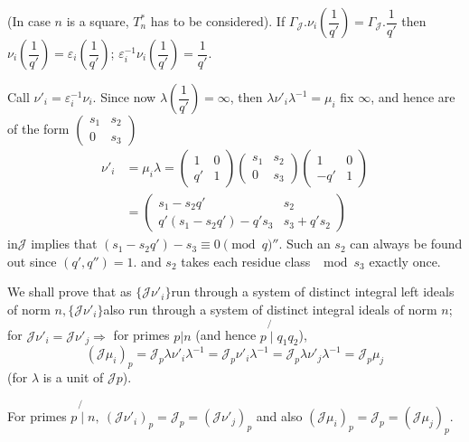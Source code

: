 (In case $n$ is a square, $T^*_n$ has to be considered). If
$\Gamma_\mathcal{J}. \nu_i \left(\dfrac{1}{q'}\right)=
\Gamma_\mathcal{J}. \dfrac{1}{q'}$ then $\nu_i \left(\dfrac{1}{q'}\right) =
\varepsilon_i \left(\dfrac{1}{q'}\right)$; $\varepsilon^{-1}_i \nu_i
\left(\dfrac{1}{q'}\right) = \dfrac{1}{q'}$. 

Call $\nu'_i = \varepsilon^{-1}_i \nu_i$. Since now $\lambda
\left(\dfrac{1}{q'}\right) = \infty$, then $\lambda \nu'_i \lambda^{-1}= \mu_i$
fix $\infty$, and hence are of the form $\begin{pmatrix} s_1 & s_2
  \\ 0 & s_3 \end{pmatrix}$ 
\begin{align*}
  \nu'_i & = \mu_i \lambda = \begin{pmatrix} 1 & 0 \\ q' &
    1 \end{pmatrix}\begin{pmatrix} s_1 & s_2 \\ 0 &
    s_3 \end{pmatrix}\begin{pmatrix} 1 & 0 \\ -q' & 1 \end{pmatrix}\\ 
  & = \begin{pmatrix} s_1-s_2q' & s_2 \\ q'(s_1-s_2q')-q's_3 &
    s_3+q's_2 \end{pmatrix} 
\end{align*}
in\pageoriginale $\mathcal{J}$ implies that $(s_1 - s_2q') - s_3 \equiv 0 \pmod
q''$. Such an $s_2$ can always be found out since $(q', q'')=1$. and
$s_2$ takes each residue class $\mod s_3$ exactly once. 

We shall prove that as $\bigg\{\mathcal{J}\nu'_i \bigg \}$run through a
system of distinct integral left ideals of norm
$n,\bigg\{\mathcal{J}\nu'_i \bigg \}$also run through a system of
distinct integral ideals of norm $n$; for
$\mathcal{J}\nu'_i=\mathcal{J}\nu'_j \Rightarrow$ for primes
$p|n$ (and hence $p \not {\mid} q_1 q_2$), 
$$
(\mathcal{J}\mu_i)_p = \mathcal{J}_p \lambda \nu'_i \lambda^{-1} =
\mathcal{J}_p \nu'_i \lambda^{-1} = \mathcal{J}_p \lambda \nu'_j
\lambda^{-1} = \mathcal{J}_p \mu_j 
$$
(for $\lambda$ is a unit of $\mathcal{J}p$).

For primes $p \not{\mid}n,~(\mathcal{J}\nu'_i)_p = \mathcal{J}_p =
(\mathcal{J}\nu'_j)_p$ and also $(\mathcal{J}\mu_i)_p = \mathcal{J}_p
= (\mathcal{J}\mu_j)_p$. 

